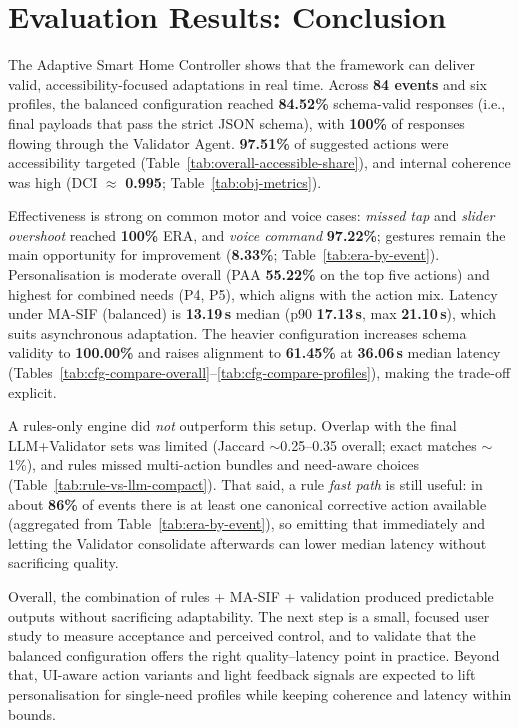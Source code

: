 \section{Evaluation Results: Conclusion}
The Adaptive Smart Home Controller shows that the framework can deliver valid, accessibility-focused adaptations in real time. Across \textbf{84 events} and six profiles, the balanced configuration reached \textbf{84.52\%} schema-valid responses (i.e., final payloads that pass the strict JSON schema), with \textbf{100\%} of responses flowing through the Validator Agent. \textbf{97.51\%} of suggested actions were accessibility targeted (Table~\ref{tab:overall-accessible-share}), and internal coherence was high (DCI $\approx$ \textbf{0.995}; Table~\ref{tab:obj-metrics}).

Effectiveness is strong on common motor and voice cases: \emph{missed tap} and \emph{slider overshoot} reached \textbf{100\%} ERA, and \emph{voice command} \textbf{97.22\%}; gestures remain the main opportunity for improvement (\textbf{8.33\%}; Table~\ref{tab:era-by-event}). Personalisation is moderate overall (PAA \textbf{55.22\%} on the top five actions) and highest for combined needs (P4, P5), which aligns with the action mix. Latency under MA-SIF (balanced) is \textbf{13.19\,s} median (p90 \textbf{17.13\,s}, max \textbf{21.10\,s}), which suits asynchronous adaptation. The heavier configuration increases schema validity to \textbf{100.00\%} and raises alignment to \textbf{61.45\%} at \textbf{36.06\,s} median latency (Tables~\ref{tab:cfg-compare-overall}–\ref{tab:cfg-compare-profiles}), making the trade-off explicit.

A rules-only engine did \emph{not} outperform this setup. Overlap with the final LLM+Validator sets was limited (Jaccard $\sim$0.25–0.35 overall; exact matches $\sim$1\%), and rules missed multi-action bundles and need-aware choices (Table~\ref{tab:rule-vs-llm-compact}). That said, a rule \emph{fast path} is still useful: in about \textbf{86\%} of events there is at least one canonical corrective action available (aggregated from Table~\ref{tab:era-by-event}), so emitting that immediately and letting the Validator consolidate afterwards can lower median latency without sacrificing quality.

Overall, the combination of rules + MA-SIF + validation produced predictable outputs without sacrificing adaptability. The next step is a small, focused user study to measure acceptance and perceived control, and to validate that the balanced configuration offers the right quality–latency point in practice. Beyond that, UI-aware action variants and light feedback signals are expected to lift personalisation for single-need profiles while keeping coherence and latency within bounds.

